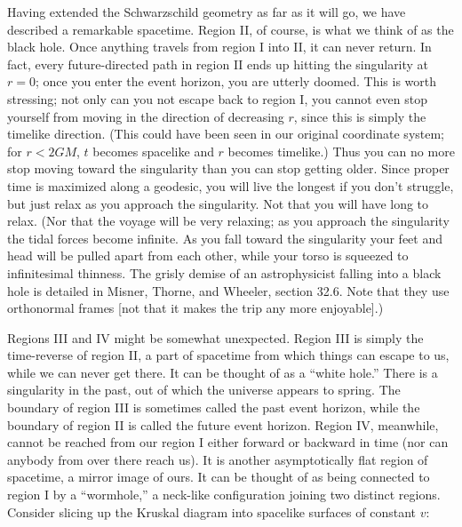 Having extended the Schwarzschild geometry as far as it will go,
we have described a remarkable spacetime.  Region II, of course,
is what we think of as the black hole.  Once anything travels from
region I into II, it can never return.  In fact, every future-directed
path in region II ends up hitting the singularity at $r=0$; once you
enter the event horizon, you are utterly doomed.  This is worth
stressing; not only can you not escape back to region I, you cannot
even stop yourself from moving in the direction of decreasing $r$,
since this is simply the timelike direction.  (This could
have been seen in our original coordinate system; for $r<2GM$, $t$
becomes spacelike and $r$ becomes timelike.)  Thus you can no more
stop moving toward the singularity than you can stop getting older.
Since proper time is maximized along a geodesic, you will live the
longest if you don't struggle, but just relax as you approach the
singularity.  Not that you will have long to relax.  (Nor that the
voyage will be very relaxing; as you approach the singularity the
tidal forces become infinite.  As you fall toward the singularity
your feet and head will be pulled apart from each other, while 
your torso is squeezed to infinitesimal thinness.  The grisly
demise of an astrophysicist falling into a black hole is detailed
in Misner, Thorne, and Wheeler, section 32.6.  Note that they use
orthonormal frames [not that it makes the trip any more enjoyable].)

Regions III and IV might be somewhat unexpected.  Region III is simply
the time-reverse of region II, a part of spacetime from which things
can escape to us, while we can never get there.  It can be thought
of as a ``white hole.''  There is a singularity in the past, out of which 
the universe appears to spring.  The boundary of region III is sometimes
called the past event horizon, while the boundary of region II is called
the future event horizon.  Region IV, meanwhile, cannot be reached
from our region I either forward or backward in time (nor can 
anybody from over there
reach us).  It is another asymptotically flat region of spacetime,
a mirror image of ours.  It can be thought of as being connected to
region I by a ``wormhole,'' a neck-like configuration joining two
distinct regions.  Consider slicing up the Kruskal diagram into spacelike
surfaces of constant $v$:

\begin{figure}[h]
  \centerline{
  }
\end{figure}

